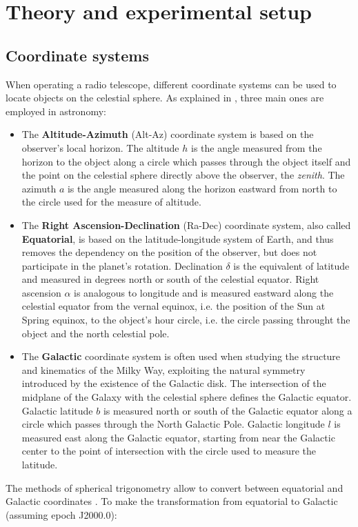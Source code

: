 \section{Theory and experimental setup}
\subsection{Coordinate systems}
When operating a radio telescope, different coordinate systems can be used to locate objects on the celestial sphere.
As explained in \cite{carroll_introduction_2007}, three main ones are employed in astronomy:
\begin{itemize}
    \item The \textbf{Altitude-Azimuth} (Alt-Az) coordinate system is based on the observer's local horizon. The {altitude} $h$ is the angle measured from the horizon to the object along a circle which passes through the object itself and the point on the celestial sphere directly above the observer, the \emph{zenith}. The {azimuth} $a$ is the angle measured along the horizon eastward from north to the circle used for the measure of altitude.
    \item The \textbf{Right Ascension-Declination} (Ra-Dec) coordinate system, also called \textbf{Equatorial}, is based on the latitude-longitude system of Earth, and thus removes the dependency on the position of the observer, but does not participate in the planet's rotation. {Declination} $\delta$ is the equivalent of latitude and measured in degrees north or south of the celestial equator. {Right ascension} $\alpha$ is analogous to longitude and is measured eastward along the celestial equator from the vernal equinox, i.e. the position of the Sun at Spring equinox, to the object's hour circle, i.e. the circle passing throught the object and the north celestial pole.
    \item The \textbf{Galactic} coordinate system is often used when studying the structure and kinematics of the Milky Way, exploiting the natural symmetry introduced by the existence of the Galactic disk. The intersection of the midplane of the Galaxy with the celestial sphere defines the Galactic equator. {Galactic latitude} $b$ is measured north or south of the Galactic equator along a circle which passes through the North Galactic Pole. {Galactic longitude} $l$ is measured east along the Galactic equator, starting from near the Galactic center to the point of intersection with the circle used to measure the latitude.
\end{itemize}
The methods of spherical trigonometry allow to convert between equatorial and Galactic coordinates \Cite{carroll_introduction_2007}. To make the transformation from equatorial to Galactic (assuming epoch J2000.0):
